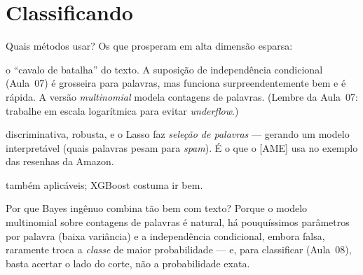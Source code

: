 \documentclass[11pt,a4paper]{article}
\begin{document}
\section{Classificando}
Quais métodos usar? Os que prosperam em alta dimensão esparsa:
\begin{description}[leftmargin=2.8cm,style=nextline]
  \item[Bayes ingênuo (multinomial)] o ``cavalo de batalha'' do texto. A suposição
        de independência condicional (Aula~07) é grosseira para palavras, mas
        funciona surpreendentemente bem e é rápida. A versão \emph{multinomial}
        modela contagens de palavras. (Lembre da Aula~07: trabalhe em escala
        logarítmica para evitar \emph{underflow}.)
  \item[Logística penalizada (Lasso/Ridge)] discriminativa, robusta, e o Lasso faz
        \emph{seleção de palavras} --- gerando um modelo interpretável (quais
        palavras pesam para \emph{spam}). É o que o [AME] usa no exemplo das resenhas
        da Amazon.
  \item[Florestas / \emph{boosting}] também aplicáveis; XGBoost costuma ir bem.
\end{description}

\begin{ideia}
Por que Bayes ingênuo combina tão bem com texto? Porque o modelo multinomial sobre
contagens de palavras é natural, há pouquíssimos parâmetros por palavra (baixa
variância) e a independência condicional, embora falsa, raramente troca a
\emph{classe} de maior probabilidade --- e, para classificar (Aula~08), basta acertar
o lado do corte, não a probabilidade exata.
\end{ideia}

\end{document}
